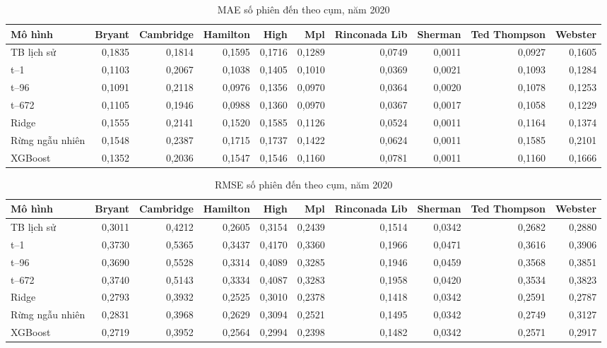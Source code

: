 \documentclass[conference,a4paper]{IEEEtran}
\begin{document}
\begin{table}[!t]
\caption{MAE số phiên đến theo cụm, năm 2020}
\label{tab:stress_2020_session_arrivals_MAE}
\centering\footnotesize
\setlength{\tabcolsep}{3pt}
\begin{tabularx}{\textwidth}{@{}Xrrrrrrrrr@{}}
\toprule
\textbf{Mô hình} & \textbf{Bryant} & \textbf{Cambridge} & \textbf{Hamilton} & \textbf{High} & \textbf{Mpl} & \textbf{Rinconada Lib} & \textbf{Sherman} & \textbf{Ted Thompson} & \textbf{Webster} \\
\midrule
TB lịch sử & 0,1835 & 0,1814 & 0,1595 & 0,1716 & 0,1289 & 0,0749 & 0,0011 & 0,0927 & 0,1605 \\
t–1 & 0,1103 & 0,2067 & 0,1038 & 0,1405 & 0,1010 & 0,0369 & 0,0021 & 0,1093 & 0,1284 \\
t–96 & 0,1091 & 0,2118 & 0,0976 & 0,1356 & 0,0970 & 0,0364 & 0,0020 & 0,1078 & 0,1253 \\
t–672 & 0,1105 & 0,1946 & 0,0988 & 0,1360 & 0,0970 & 0,0367 & 0,0017 & 0,1058 & 0,1229 \\
Ridge & 0,1555 & 0,2141 & 0,1520 & 0,1585 & 0,1126 & 0,0524 & 0,0011 & 0,1164 & 0,1374 \\
Rừng ngẫu nhiên & 0,1548 & 0,2387 & 0,1715 & 0,1737 & 0,1422 & 0,0624 & 0,0011 & 0,1585 & 0,2101 \\
XGBoost & 0,1352 & 0,2036 & 0,1547 & 0,1546 & 0,1160 & 0,0781 & 0,0011 & 0,1160 & 0,1666 \\
\bottomrule
\end{tabularx}
\end{table}

\begin{table}[!t]
\caption{RMSE số phiên đến theo cụm, năm 2020}
\label{tab:stress_2020_session_arrivals_RMSE}
\centering\footnotesize
\setlength{\tabcolsep}{3pt}
\begin{tabularx}{\textwidth}{@{}Xrrrrrrrrr@{}}
\toprule
\textbf{Mô hình} & \textbf{Bryant} & \textbf{Cambridge} & \textbf{Hamilton} & \textbf{High} & \textbf{Mpl} & \textbf{Rinconada Lib} & \textbf{Sherman} & \textbf{Ted Thompson} & \textbf{Webster} \\
\midrule
TB lịch sử & 0,3011 & 0,4212 & 0,2605 & 0,3154 & 0,2439 & 0,1514 & 0,0342 & 0,2682 & 0,2880 \\
t–1 & 0,3730 & 0,5365 & 0,3437 & 0,4170 & 0,3360 & 0,1966 & 0,0471 & 0,3616 & 0,3906 \\
t–96 & 0,3690 & 0,5528 & 0,3314 & 0,4089 & 0,3285 & 0,1946 & 0,0459 & 0,3568 & 0,3851 \\
t–672 & 0,3740 & 0,5143 & 0,3334 & 0,4087 & 0,3283 & 0,1958 & 0,0420 & 0,3534 & 0,3823 \\
Ridge & 0,2793 & 0,3932 & 0,2525 & 0,3010 & 0,2378 & 0,1418 & 0,0342 & 0,2591 & 0,2787 \\
Rừng ngẫu nhiên & 0,2831 & 0,3968 & 0,2629 & 0,3094 & 0,2521 & 0,1495 & 0,0342 & 0,2749 & 0,3127 \\
XGBoost & 0,2719 & 0,3952 & 0,2564 & 0,2994 & 0,2398 & 0,1482 & 0,0342 & 0,2571 & 0,2917 \\
\bottomrule
\end{tabularx}
\end{table}
\end{document}

